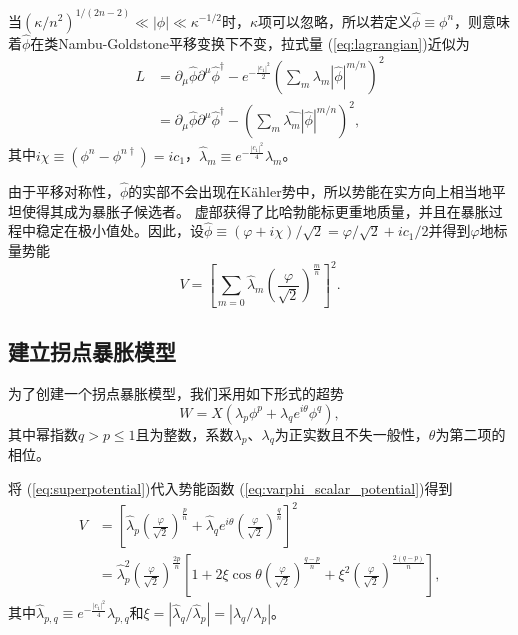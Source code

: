 当${(\kappa/n^2)}^{1/(2n-2)}\ll |\phi| \ll
\kappa^{-1/2}$时，$\kappa$项可以忽略，所以若定义$\hat{\phi} \equiv
\phi^n$，则意味着$\hat{\phi}$在类Nambu-Goldstone平移变换下不变，拉式量
(\ref{eq:lagrangian})近似为
\begin{equation}
\begin{split}
    L &= \partial_\mu \hat{\phi}\partial^\mu \hat{\phi}^\dagger -
    e^{-\frac{|c_1|^2}{2}}{(\sum_m \lambda_m|\hat{\phi}|^{m/n})}^2 \\
    &= \partial_\mu \hat{\phi} \partial^\mu \hat{\phi}^\dagger - 
    {(\sum_m \hat{\lambda_m}|\hat{\phi}|^{m/n})}^2,
\end{split}
\end{equation}
其中$i\chi \equiv (\phi^n - \phi^{n\dagger})=i c_1$，$\hat{\lambda}_m\equiv
e^{-\frac{|c_1|^2}{4}}\lambda_m$。

由于平移对称性，$\hat{\phi}$的实部不会出现在K\"ahler势中，所以势能在实方向上相当地平坦使得其成为暴胀子候选者。
虚部获得了比哈勃能标更重地质量，并且在暴胀过程中稳定在极小值处。因此，设$\hat{\phi}\equiv
(\varphi+i \chi)/\sqrt{2}=\varphi/\sqrt{2}+i
c_1/2$并得到$\varphi$地标量势能
\begin{equation}\label{eq:varphi_scalar_potential}
    V = {\left[\sum_{m=0}\hat{\lambda}_m
    {\left(\frac{\varphi}{\sqrt{2}}\right)}^{\frac{m}{n}}\right]}^2.
\end{equation}

\subsection{建立拐点暴胀模型}
为了创建一个拐点暴胀模型，我们采用如下形式的超势
\begin{equation}\label{eq:superpotential}
    W = X(\lambda_p\phi^p + \lambda_q e^{i\theta}\phi^q),
\end{equation}
其中幂指数$q > p \le
1$且为整数，系数$\lambda_p$、$\lambda_q$为正实数且不失一般性，$\theta$为第二项的相位。

将 (\ref{eq:superpotential})代入势能函数
(\ref{eq:varphi_scalar_potential})得到
\begin{equation}
\begin{split}
    V &= {\left[ \hat{\lambda}_p {\left(\frac{\varphi}{\sqrt{2}}\right)}^{\frac{p}{n}}
    + \hat{\lambda}_q e^{i\theta}{\left(\frac{\varphi}{\sqrt{2}}\right)}^{\frac{q}{n}}\right]}^2 \\
    &= \hat{\lambda}_p^2 {\left(\frac{\varphi}{\sqrt{2}}\right)}^{\frac{2p}{n}}
    \left[1 + 2\xi\cos\theta {\left(\frac{\varphi}{\sqrt{2}}\right)}^{\frac{q-p}{n}}
    + \xi^2 {\left(\frac{\varphi}{\sqrt{2}}\right)}^{\frac{2(q-p)}{n}}\right],
\end{split}
\end{equation}
其中$\hat{\lambda}_{p,q}\equiv
e^{-\frac{|c_1|^2}{4}}\lambda_{p,q}$和$\xi=|\hat{\lambda}_q/\hat{\lambda}_p|=|\lambda_q/\lambda_p|$。

